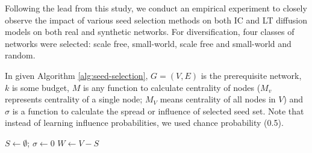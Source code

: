 	Following the lead from this study, we conduct an empirical experiment \cite{hussain2013a} to closely observe the impact of various seed selection methods on both IC and LT diffusion models on both real and synthetic networks. For diversification, four classes of networks were selected: scale free, small-world, scale free and small-world and random.
	
	
	In given Algorithm \ref{alg:seed-selection}, $G=(V,E)$ is the prerequisite network, $k$ is some budget, $M$ is any function to calculate centrality of nodes ($M_v$ represents centrality of a single node; $M_{V}$ means centrality of all nodes in $V$) and $\sigma$ is a function to calculate the spread or influence of selected seed set. Note that instead of learning influence probabilities, we used chance probability (0.5).
	
	\begin{algorithm}[h]
		\caption{Diffusion algorithm using various seed selection methods}
		\label{alg:seed-selection}
		\SetAlgoLined
		$S \leftarrow \emptyset$; $\sigma \leftarrow 0$
		\newline
		$W \gets V-S$
		\newline
	\end{algorithm}

